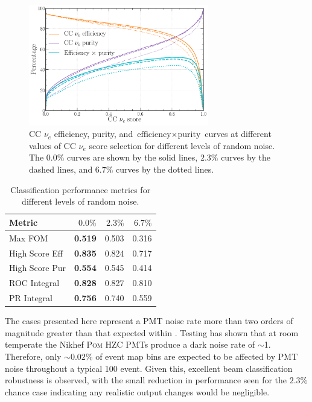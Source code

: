 \begin{figure} %
    \includegraphics[width=0.7\textwidth]{diagrams/7-results/calib_noise_nuel_eff_curves.pdf}
    \caption[CC $\nu_{e}$ efficiency and purity curves for different levels of random noise]
    {CC $\nu_{e}$ efficiency, purity, and $\text{efficiency}\times\text{purity}$ curves at
        different values of CC $\nu_{e}$ score selection for different levels of random noise. The
        $0.0\%$ curves are shown by the solid lines, $2.3\%$ curves by the dashed lines, and
        $6.7\%$ curves by the dotted lines.}
    \label{fig:calib_noise_nuel_eff_curves}
\end{figure}

\begin{table} %
    \begin{tabular}{lrrr}
        Metric         & $0.0\%$        & $2.3\%$ & $6.7\%$ \\
        \midrule
        Max FOM        & \textbf{0.519} & 0.503   & 0.316   \\
        High Score Eff & \textbf{0.835} & 0.824   & 0.717   \\
        High Score Pur & \textbf{0.554} & 0.545   & 0.414   \\
        ROC Integral   & \textbf{0.828} & 0.827   & 0.810   \\
        PR Integral    & \textbf{0.756} & 0.740   & 0.559   \\
    \end{tabular}
    \caption[Classification performance metrics for different levels of random noise]
    {Classification performance metrics for different levels of random noise.}
    \label{tab:calib_time}
\end{table}

The cases presented here represent a PMT noise rate more than two orders of magnitude greater than
that expected within \chipsfive. Testing has shown that at room temperate the Nikhef \textsc{Pom}
HZC PMTs produce a dark noise rate of $\sim$\unit{1}{}. Therefore, only $\sim0.02\%$ of
event map bins are expected to be affected by PMT noise throughout a typical \unit{100}{}
event. Given this, excellent beam classification robustness is observed, with the small reduction
in performance seen for the $2.3\%$ chance case indicating any realistic output changes would be
negligible.

